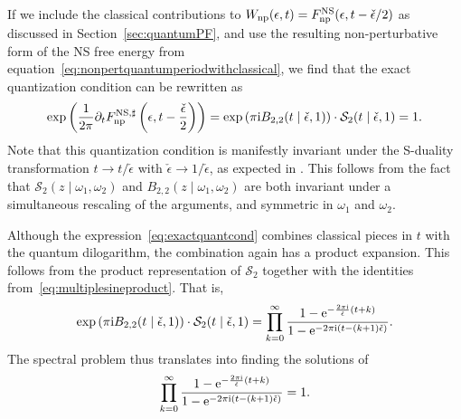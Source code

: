 \documentclass[pdftex]{sigma}
\numberwithin{equation}{section}
\begin{document}
If we include the classical contributions to $W_{\rm np} (\epsilon,t) = F^{\rm NS}_{{\rm np}}(\epsilon,t-\check{\epsilon}/2)$ as discussed in Section~\ref{sec:quantumPF}, and use the resulting non-perturbative form of the NS free energy from equation~\eqref{eq:nonpertquantumperiodwithclassical}, we find that the exact quantization condition can be rewritten as
\begin{equation}\label{eq:exactquantcond}
 \exp\left( \frac{1}{2\pi} \partial_t F^{{\rm NS},\sharp}_{{\rm np}} \left(\epsilon,t-\frac{\check{\epsilon}}{2} \right) \right) = \exp\left( \pi \mathrm{i} B_{2,2}(t\mid \check{\epsilon},1) \right) \cdot \mathcal{S}_2(t\mid \check{\epsilon},1) = 1.
\end{equation}
Note that this quantization condition is manifestly invariant under the S-duality transformation $t\rightarrow t/\check{\epsilon}$ with $\check{\epsilon}\rightarrow 1/\check{\epsilon}$, as expected in \cite{Hatsuda:2015fxa}. This follows from the fact that $\mathcal{S}_2(z \mid \omega_1,\omega_2)$ and $B_{2,2}(z \mid \omega_1,\omega_2)$ are both invariant under a simultaneous rescaling of the arguments, and symmetric in $\omega_1$ and $\omega_2$.

Although the expression~\eqref{eq:exactquantcond} combines classical pieces in $t$ with the quantum dilogarithm, the combination again has a product expansion. This follows from the product representation of $\mathcal{S}_2$ together with the identities from~\eqref{eq:multiplesineproduct}. That is,
\begin{equation*}
 \exp\left(\pi \mathrm{i} B_{2,2}(t\mid \check{\epsilon},1) \right) \cdot \mathcal{S}_2(t\mid \check{\epsilon},1)= \prod_{k=0}^{\infty} \frac{1- {\rm e}^{-\frac{2\pi \mathrm{i}}{\check{\epsilon}} (t+k)}}{1- {\rm e}^{- 2\pi \mathrm{i} (t-(k+1)\check{\epsilon})}}.
\end{equation*}
The spectral problem thus translates into finding the solutions of
\begin{equation}\label{eqn:TBA}
 \prod_{k=0}^{\infty} \frac{1- {\rm e}^{-\frac{2\pi \mathrm{i}}{\check{\epsilon}} (t+k)}}{1- {\rm e}^{- 2\pi \mathrm{i} (t-(k+1)\check{\epsilon})}} =1.
\end{equation}
\end{document}

